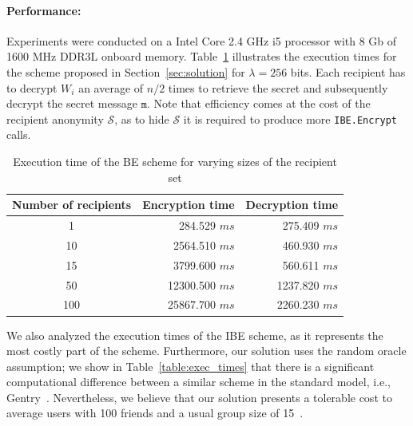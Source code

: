 \documentclass[journal]{IEEEtran}
\newcommand{\tabref}[1]{{Table}~\ref{#1}}
\newcommand{\secref}[1]{{Section}~\ref{#1}}
\newcommand{\msg}{\ensuremath{\mathtt{m}}}
\newcommand{\ms}{\ensuremath{ms}}
\begin{document}
\paragraph{Performance:} 
Experiments were conducted on a Intel Core 2.4 GHz i5 processor with 8 Gb of 1600 MHz DDR3L onboard memory. Table~\ref{table:BE_exec_times} illustrates the 
execution times for the scheme proposed in \secref{sec:solution} for $\lambda=256$ bits. Each recipient has to decrypt $W_i$ an average of $n/2$ times to retrieve the secret and subsequently decrypt the secret message \msg. Note that efficiency comes at the cost of the recipient anonymity $\mathcal{S}$, as to hide $\mathcal{S}$ it is required to produce more \texttt{IBE.Encrypt} calls.

\begin{table}
\begin{center}
\begin{tabular}{ | c | r | r |}
    \hline
    Number of recipients & Encryption time & Decryption time \\ \hline  \hline
    1 & 284.529 \ms & 275.409 \ms \\
    10 & 2564.510 \ms & 460.930 \ms \\
    15 & 3799.600 \ms & 560.611 \ms \\
    50 & 12300.500 \ms & 1237.820 \ms \\
    100 & 25867.700 \ms & 2260.230 \ms \\ \hline
\end{tabular}
\end{center}
\caption{Execution time of the BE scheme for varying sizes of the recipient set}
\label{table:BE_exec_times}
\end{table}

We also analyzed the execution times of the IBE scheme, as it represents the most costly part of the scheme. Furthermore, our solution uses the random oracle assumption; we show in \tabref{table:exec_times} that there is a significant computational difference between a similar scheme in the standard model, i.e., Gentry~\cite{GentryRandomOracles}.
Nevertheless, we believe that our solution presents a tolerable cost to average users with 100 friends and a usual group size of 15~\cite{DBLP:journals/corr/abs-1111-4503}. 
\end{document}
